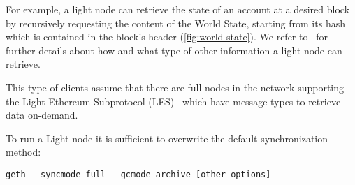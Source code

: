 For example, a light node can retrieve the state of an account at a desired
block by recursively requesting the content of the World State, starting from
its hash which is contained in the block's header (\autoref{fig:world-state}).
We refer to~\cite{bib:light-client} for further details about how and what type
of other information a light node can retrieve.

This type of clients assume that there are full-nodes in the network supporting
the Light Ethereum Subprotocol (LES)~\cite{bib:les-protocol} which have message
types to retrieve data on-demand.

To run a Light node it is sufficient to overwrite the default synchronization
method:
\begin{center}
    \verb|geth --syncmode full --gcmode archive [other-options]|
\end{center}